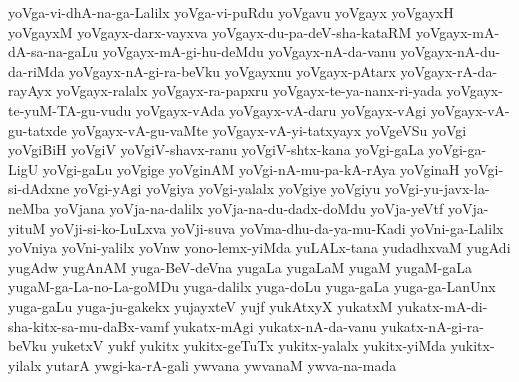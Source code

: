 {yoVga-vi-dhA-na-ga-Lalilx
yoVga-vi-puRdu
yoVgavu
yoVgayx
yoVgayxH
yoVgayxM
yoVgayx-darx-vayxva
yoVgayx-du-pa-deV-sha-kataRM
yoVgayx-mA-dA-sa-na-gaLu
yoVgayx-mA-gi-hu-deMdu
yoVgayx-nA-da-vanu
yoVgayx-nA-du-da-riMda
yoVgayx-nA-gi-ra-beVku
yoVgayxnu
yoVgayx-pAtarx
yoVgayx-rA-da-rayAyx
yoVgayx-ralalx
yoVgayx-ra-papxru
yoVgayx-te-ya-nanx-ri-yada
yoVgayx-te-yuM-TA-gu-vudu
yoVgayx-vAda
yoVgayx-vA-daru
yoVgayx-vAgi
yoVgayx-vA-gu-tatxde
yoVgayx-vA-gu-vaMte
yoVgayx-vA-yi-tatxyayx
yoVgeVSu
yoVgi
yoVgiBiH
yoVgiV
yoVgiV-shavx-ranu
yoVgiV-shtx-kana
yoVgi-gaLa
yoVgi-ga-LigU
yoVgi-gaLu
yoVgige
yoVginAM
yoVgi-nA-mu-pa-kA-rAya
yoVginaH
yoVgi-si-dAdxne
yoVgi-yAgi
yoVgiya
yoVgi-yalalx
yoVgiye
yoVgiyu
yoVgi-yu-javx-la-neMba
yoVjana
yoVja-na-dalilx
yoVja-na-du-dadx-doMdu
yoVja-yeVtf
yoVja-yituM
yoVji-si-ko-LuLxva
yoVji-suva
yoVma-dhu-da-ya-mu-Kadi
yoVni-ga-Lalilx
yoVniya
yoVni-yalilx
yoVnw
yono-lemx-yiMda
yuLALx-tana
yudadhxvaM
yugAdi
yugAdw
yugAnAM
yuga-BeV-deVna
yugaLa
yugaLaM
yugaM
yugaM-gaLa
yugaM-ga-La-no-La-goMDu
yuga-dalilx
yuga-doLu
yuga-gaLa
yuga-ga-LanUnx
yuga-gaLu
yuga-ju-gakekx
yujayxteV
yujf
yukAtxyX
yukatxM
yukatx-mA-di-sha-kitx-sa-mu-daBx-vamf
yukatx-mAgi
yukatx-nA-da-vanu
yukatx-nA-gi-ra-beVku
yuketxV
yukf
yukitx
yukitx-geTuTx
yukitx-yalalx
yukitx-yiMda
yukitx-yilalx
yutarA
ywgi-ka-rA-gali
ywvana
ywvanaM
ywva-na-mada
}
